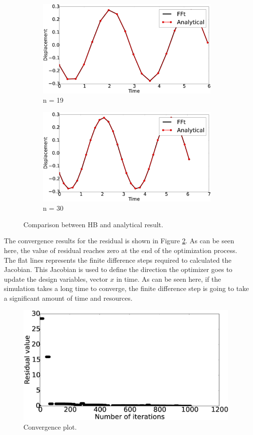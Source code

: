 \documentclass[12pt, a4paper]{extarticle}
\begin{document}
\begin{figure}[H]
	\centering
	\begin{subfigure}[h]{8.0 cm}
		\includegraphics[width=8.0 cm]{figure/1N19.eps}
		\caption{n = 19}
	\end{subfigure}
	\begin{subfigure}[h]{8.0 cm}
        \includegraphics[width=8.0 cm]{figure/1N30.eps}
		\caption{n = 30}
    \end{subfigure}
    \caption{Comparison between HB and analytical result.}
    \label{fig:R1}
\end{figure}

The convergence results for the residual is shown in Figure \ref{fig:R1_convergence}. As can be seen here, the value of residual reaches zero at the end of the optimization process. The flat lines represents the finite difference steps required to calculated the Jacobian. This Jacobian is used to define the direction the optimizer goes to update the design variables, vector $x$ in time. As can be seen here, if the simulation takes a long time to converge, the finite difference step is going to take a significant amount of time and resources.

\begin{figure}[h]
	\centering
	\includegraphics[height=6.00cm]{figure/convergence_study_31.eps}
	\caption{Convergence plot.}
	\label{fig:R1_convergence}
\end{figure}
\end{document}
